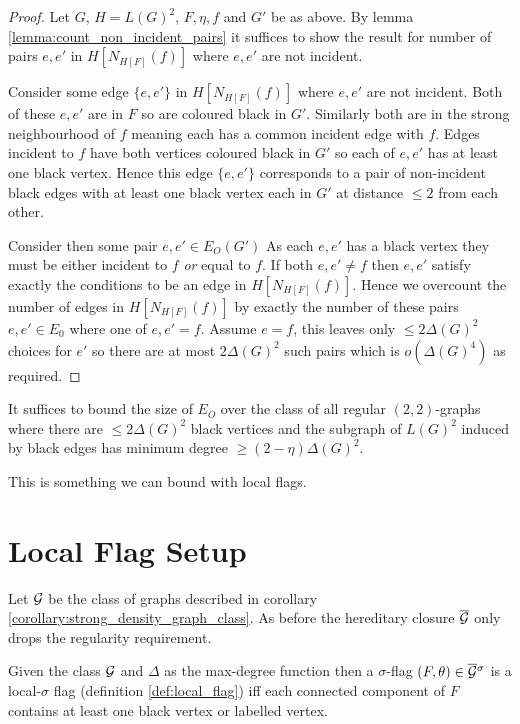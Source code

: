 \begin{proof}
    Let $G$, $H=L(G)^2$, $F, \eta, f$ and $G'$ be as above.
    By lemma \ref{lemma:count_non_incident_pairs} it suffices to show the result for
    number of pairs $e,e'$ in $H[N_{H[F]}(f)]$ where $e,e'$ are not incident.

    Consider some edge $\{e, e'\}$ in
    $H[N_{H[F]}(f)]$ where $e,e'$ are not incident.
    Both of these $e,e'$ are in $F$ so are coloured black in $G'$.
    Similarly both are in the strong neighbourhood of $f$ meaning each has a common
    incident edge with $f$. Edges incident to $f$ have both vertices coloured black
    in $G'$ so each of $e, e'$ has at least one black vertex.
    Hence this edge $\{e, e'\}$ corresponds to a pair of non-incident black edges with at least one
    black vertex each in $G'$ at distance $\leq 2$ from each other.

    Consider then some pair $e,e' \in E_O(G')$
    As each $e,e'$ has a black vertex they must be either incident to $f$ \textit{or} equal
    to $f$. If both $e, e' \neq f$ then
    $e, e'$ satisfy exactly the conditions to be an edge in $H[N_{H[F]}(f)]$.
    Hence we overcount the number of edges in $H[N_{H[F]}(f)]$ by exactly the
    number of these pairs $e, e'\in E_0$ where one of $e, e' = f$. Assume $e=f$,
    this leaves only $\leq 2\Delta(G)^2$ choices for $e'$ so there are at most
    $2\Delta(G)^2$ such pairs which is $o(\Delta(G)^4)$ as required.
\end{proof}

\begin{corollary}
    \label{corollary:strong_density_graph_class}
    It suffices to bound the size of $E_O$
    over the class of all regular $(2,2)$-graphs where there are $\leq 2\Delta(G)^2$ black
    vertices and the subgraph of $L(G)^2$ induced by black edges has minimum
    degree $\geq (2-\eta)\Delta(G)^2$.
\end{corollary}

This is something we can bound with local flags.

\section{Local Flag Setup}

Let $\mathcal{G}$ be the class of graphs described in corollary \ref{corollary:strong_density_graph_class}.
As before the hereditary closure $\overline{\mathcal{G}}$ only drops the regularity requirement.

\begin{lemma}
    Given the class $\mathcal{G}$ and $\Delta$ as the max-degree function then a
    $\sigma$-flag $(F, \theta)\in \overline{\mathcal{G}}{}^\sigma$ is a local-$\sigma$ flag (definition
    \ref{def:local_flag}) iff
    each connected component of $F$ contains at least one black vertex or labelled vertex.
\end{lemma}

